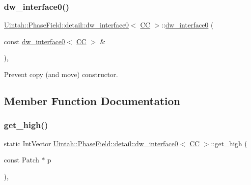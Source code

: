 \subsubsection{\texorpdfstring{dw\+\_\+interface0()}{dw\_interface0()}\hspace{0.1cm}{\footnotesize\ttfamily [2/2]}}
{\footnotesize\ttfamily \hyperlink{classUintah_1_1PhaseField_1_1detail_1_1dw__interface0}{Uintah\+::\+Phase\+Field\+::detail\+::dw\+\_\+interface0}$<$ \hyperlink{namespaceUintah_1_1PhaseField_a33d355affda78a83f45755ba8388cedda22303704507d024d1d6508ed9859a85a}{CC} $>$\+::\hyperlink{classUintah_1_1PhaseField_1_1detail_1_1dw__interface0}{dw\+\_\+interface0} (\begin{DoxyParamCaption}\item[{const \hyperlink{classUintah_1_1PhaseField_1_1detail_1_1dw__interface0}{dw\+\_\+interface0}$<$ \hyperlink{namespaceUintah_1_1PhaseField_a33d355affda78a83f45755ba8388cedda22303704507d024d1d6508ed9859a85a}{CC} $>$ \&}]{ }\end{DoxyParamCaption})\hspace{0.3cm}{\ttfamily [protected]}, {\ttfamily [delete]}}



Prevent copy (and move) constructor. 



\subsection{Member Function Documentation}
\mbox{\label{classUintah_1_1PhaseField_1_1detail_1_1dw__interface0_3_01CC_01_4_ac43d60210f4efd7ffa0ca62788161f8a}} 
\subsubsection{\texorpdfstring{get\+\_\+high()}{get\_high()}}
{\footnotesize\ttfamily static Int\+Vector \hyperlink{classUintah_1_1PhaseField_1_1detail_1_1dw__interface0}{Uintah\+::\+Phase\+Field\+::detail\+::dw\+\_\+interface0}$<$ \hyperlink{namespaceUintah_1_1PhaseField_a33d355affda78a83f45755ba8388cedda22303704507d024d1d6508ed9859a85a}{CC} $>$\+::get\+\_\+high (\begin{DoxyParamCaption}\item[{const Patch $\ast$}]{p }\end{DoxyParamCaption})\hspace{0.3cm}{\ttfamily [inline]}, {\ttfamily [static]}}



